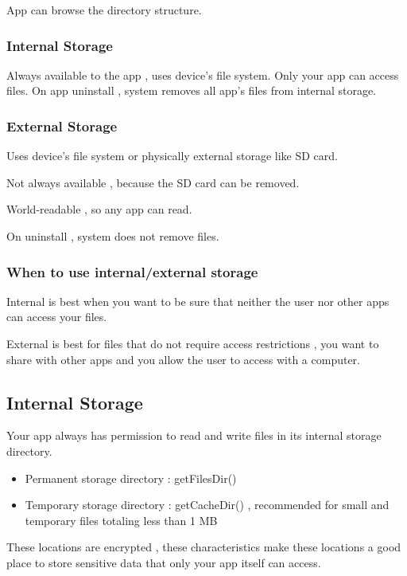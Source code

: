 \documentclass{article}
\begin{document}
App can browse the directory structure.

\subsubsection{Internal Storage}

Always available to the app , uses device's file system.
Only your app can access files.
On app uninstall , system removes all app's files from internal storage.

\subsubsection{External Storage}

Uses device's file system or physically external storage like SD card.

Not always available , because the SD card can be removed.

World-readable , so any app can read.

On uninstall , system does not remove files.

\subsubsection{When to use internal/external storage}

Internal is best when you want to be sure that neither the user nor other apps can access your files.

External is best for files that do not require access restrictions , you want to share with other apps and you allow the user to access with a computer.

\subsection{Internal Storage}

Your app always has permission to read and write files in its internal storage directory.

\begin{itemize}
    \item Permanent storage directory : getFilesDir()
    \item Temporary storage directory : getCacheDir() , recommended for small and temporary files totaling less than 1 MB
\end{itemize}

These locations are encrypted , these characteristics make these locations a good place to store sensitive data that only your app itself can access.
\end{document}
